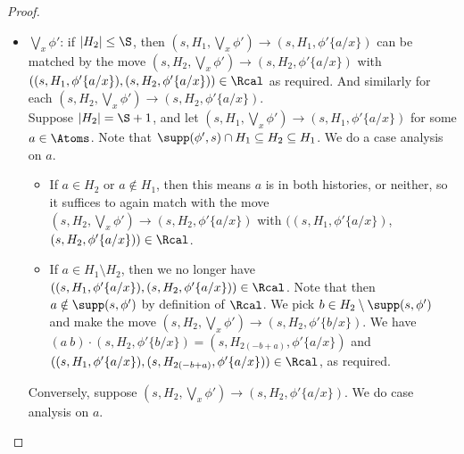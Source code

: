 \begin{proof}
\begin{itemize}
        Conversely, the possible moves in $\Gcal_\S$ are $(s, H_2, \phi) \rightarrow (s, H_2, \phi'\{a/x\})$ for $a \# \phi,H_2$. 
        If $a \notin H_1$, then as before this can be matched by $(s, H_1, \phi)\rightarrow (s, H_1, \phi'\{a/x\})$ with $((s, H_1, \phi'\{a/x\})$, $(s, H_2, \phi'\{a/x\})) \in \Rcal$.
        Otherwise, {and this is the more interesting case}, suppose $a \in H_1 \setminus H_2\cup\supp(\phi)$.
Then, we can select some $b \notin H_1$, meaning $b \notin H_2$ and $(a\ b)\cdot (s, H_2, \phi'\{a/x\}) = (s, H_2, \phi'\{b/x\})$. This can be matched by $(s, H_1, \phi) \rightarrow (s, H_1, \phi'\{b/x\})$ with $((s, H_1, \phi'\{b/x\}), (s, H_2, \phi'\{b/x\})) \in \Rcal$ as required. 
        \item $\bigvee_x \phi'$: 
        if $|H_2| \le \S$, then $(s, H_1, \bigvee_x \phi') \rightarrow (s, H_1, \phi'\{a/x\})$ can be matched by the move $(s, H_2, \bigvee_x \phi') \rightarrow (s, H_2, \phi'\{a/x\})$ with $((s, H_1, \phi'\{a/x\}), (s, H_2, \phi'\{a/x\})) \in \Rcal$ as required. And similarly for each $(s, H_2, \bigvee_x \phi') \rightarrow (s, H_2, \phi'\{a/x\})$.
        \\
        Suppose $|H_2| = \S+1$, and
        let $(s, H_1, \bigvee_x \phi') \rightarrow (s, H_1, \phi'\{a/x\})$ for some $a \in \Atoms$.
Note that $\supp(\phi', s) \cap H_1 \subseteq H_2 \subseteq H_1$. We do a case analysis on $a$.
        \begin{itemize}
            \item 
        If $a \in H_2$ or $a\notin H_1$, then this means $a$ is in both histories, or neither, so it suffices to again match with the move $(s, H_2, \bigvee_x \phi') \rightarrow (s, H_2, \phi'\{a/x\})$ with $((s, H_1, \phi'\{a/x\})$, $(s, H_2, \phi'\{a/x\})) \in \Rcal$. 
        \item
        If $a \in H_1 \setminus H_2$, then we no longer have 
        $((s, H_1, \phi'\{a/x\}),(s, H_2, \phi'\{a/x\})) \in \Rcal$. 
        Note that then $a\notin\supp(s,\phi')$ by definition of $\Rcal$. 
        We pick $b\in H_2\setminus\supp(s,\phi')$ and make the move
        $(s, H_2, \bigvee_x \phi') \rightarrow (s, H_2, \phi'\{b/x\})$. We have $(a\ b)\cdot(s, H_2, \phi'\{b/x\})=(s, H_{2(-b+a)}, \phi'\{a/x\})$ and
        $((s, H_1, \phi'\{a/x\}),(s, H_{2(-b+a)}, \phi'\{a/x\})) \in \Rcal$, as required.
                \end{itemize}
        Conversely, suppose $(s, H_2, \bigvee_x \phi')\to(s, H_2, \phi'\{a/x\})$. We do case analysis on $a$.
        \begin{itemize}

\end{itemize}
\end{itemize}
\end{proof}

